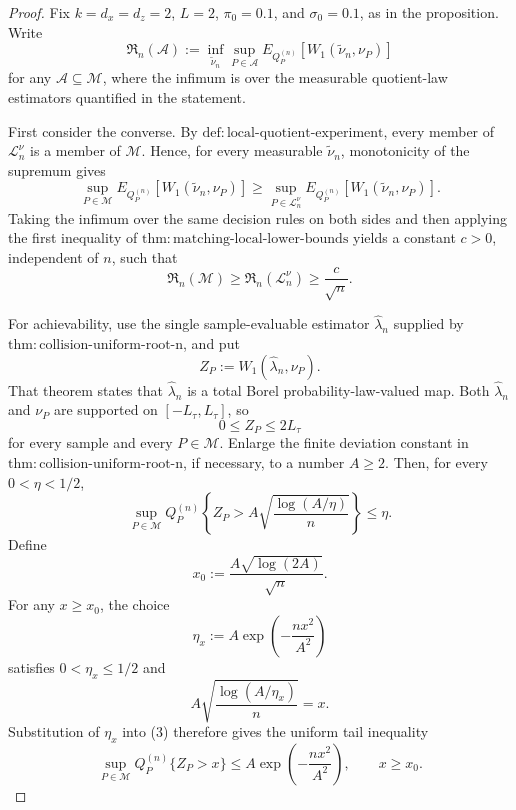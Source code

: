 \documentclass{article}
\begin{document}
\begin{proof}
Fix \(k=d_x=d_z=2\), \(L=2\), \(\pi_0=0.1\), and \(\sigma_0=0.1\), as in the proposition.  Write
\[
\mathfrak R_n(\mathcal A):=
\inf_{\widetilde\nu_n}\sup_{P\in\mathcal A}
E_{Q_P^{(n)}}\!\left[W_1(\widetilde\nu_n,\nu_P)\right]
\]
for any \(\mathcal A\subseteq\mathcal M\), where the infimum is over the measurable quotient-law estimators quantified in the statement.

First consider the converse.  By \(\mathrm{def:local\text{-}quotient\text{-}experiment}\), every member of \(\mathcal L_n^\nu\) is a member of \(\mathcal M\).  Hence, for every measurable \(\widetilde\nu_n\), monotonicity of the supremum gives
\[
\sup_{P\in\mathcal M}E_{Q_P^{(n)}}\!\left[W_1(\widetilde\nu_n,\nu_P)\right]
\ge
\sup_{P\in\mathcal L_n^\nu}E_{Q_P^{(n)}}\!\left[W_1(\widetilde\nu_n,\nu_P)\right].
\]
Taking the infimum over the same decision rules on both sides and then applying the first inequality of \(\mathrm{thm:matching\text{-}local\text{-}lower\text{-}bounds}\) yields a constant \(c>0\), independent of \(n\), such that
\[
\mathfrak R_n(\mathcal M)
\ge \mathfrak R_n(\mathcal L_n^\nu)
\ge \frac{c}{\sqrt n}.
\tag{1}
\]

For achievability, use the single sample-evaluable estimator \(\widehat\lambda_n\) supplied by \(\mathrm{thm:collision\text{-}uniform\text{-}root\text{-}n}\), and put
\[
Z_P:=W_1(\widehat\lambda_n,\nu_P).
\]
That theorem states that \(\widehat\lambda_n\) is a total Borel probability-law-valued map.  Both \(\widehat\lambda_n\) and \(\nu_P\) are supported on \([-L_\tau,L_\tau]\), so
\[
0\le Z_P\le 2L_\tau
\tag{2}
\]
for every sample and every \(P\in\mathcal M\).  Enlarge the finite deviation constant in \(\mathrm{thm:collision\text{-}uniform\text{-}root\text{-}n}\), if necessary, to a number \(A\ge2\).  Then, for every \(0<\eta<1/2\),
\[
\sup_{P\in\mathcal M}Q_P^{(n)}\!\left\{
Z_P>A\sqrt{\frac{\log(A/\eta)}{n}}
\right\}\le\eta.
\tag{3}
\]
Define
\[
x_0:=\frac{A\sqrt{\log(2A)}}{\sqrt n}.
\]
For any \(x\ge x_0\), the choice
\[
\eta_x:=A\exp\!\left(-\frac{nx^2}{A^2}\right)
\]
satisfies \(0<\eta_x\le1/2\) and
\[
A\sqrt{\frac{\log(A/\eta_x)}{n}}=x.
\]
Substitution of \(\eta_x\) into (3) therefore gives the uniform tail inequality
\[
\sup_{P\in\mathcal M}Q_P^{(n)}\{Z_P>x\}
\le A\exp\!\left(-\frac{nx^2}{A^2}\right),
\qquad x\ge x_0.
\tag{4}
\]


\end{proof}
\end{document}
